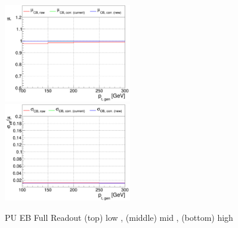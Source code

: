 \begin{figure}
\includegraphics[width=0.495\textwidth]{./plots_pdf/ECAL_plots/plotsPU/EB/FULL/pdf/GENPT/EBFULL_GENPT_0100_0300_MuOverBins.pdf}
\includegraphics[width=0.495\textwidth]{./plots_pdf/ECAL_plots/plotsPU/EB/FULL/pdf/GENPT/EBFULL_GENPT_0100_0300_EffSigmaOverBins.pdf}

\caption [Energy response of PF ECAL cluster vs \pt for PU EB Full readout senario]{PU EB Full Readout (top) low \pt, (middle) mid \pt, (bottom) high \pt}
\label{fig:PU_EBFULL_pt}
\end{figure}


